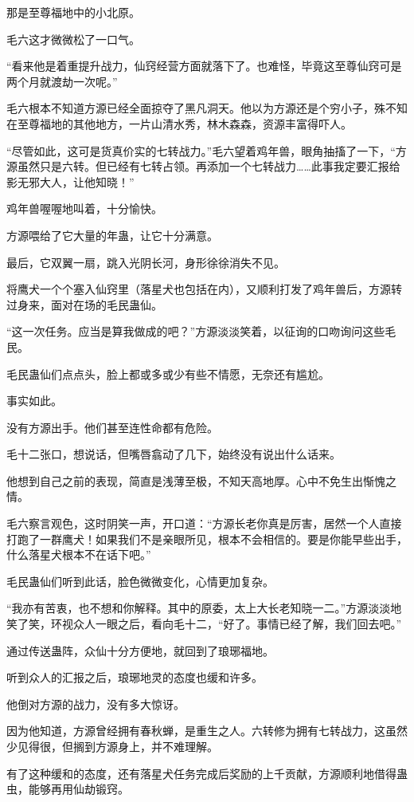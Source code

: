 \begin{this_body}
那是至尊福地中的小北原。

毛六这才微微松了一口气。

“看来他是着重提升战力，仙窍经营方面就落下了。也难怪，毕竟这至尊仙窍可是两个月就渡劫一次呢。”

毛六根本不知道方源已经全面掠夺了黑凡洞天。他以为方源还是个穷小子，殊不知在至尊福地的其他地方，一片山清水秀，林木森森，资源丰富得吓人。

“尽管如此，这可是货真价实的七转战力。”毛六望着鸡年兽，眼角抽搐了一下，“方源虽然只是六转。但已经有七转占领。再添加一个七转战力……此事我定要汇报给影无邪大人，让他知晓！”

鸡年兽喔喔地叫着，十分愉快。

方源喂给了它大量的年蛊，让它十分满意。

最后，它双翼一扇，跳入光阴长河，身形徐徐消失不见。

将鹰犬一个个塞入仙窍里（落星犬也包括在内），又顺利打发了鸡年兽后，方源转过身来，面对在场的毛民蛊仙。

“这一次任务。应当是算我做成的吧？”方源淡淡笑着，以征询的口吻询问这些毛民。

毛民蛊仙们点点头，脸上都或多或少有些不情愿，无奈还有尴尬。

事实如此。

没有方源出手。他们甚至连性命都有危险。

毛十二张口，想说话，但嘴唇翕动了几下，始终没有说出什么话来。

他想到自己之前的表现，简直是浅薄至极，不知天高地厚。心中不免生出惭愧之情。

毛六察言观色，这时阴笑一声，开口道：“方源长老你真是厉害，居然一个人直接打跑了一群鹰犬！如果我们不是亲眼所见，根本不会相信的。要是你能早些出手，什么落星犬根本不在话下吧。”

毛民蛊仙们听到此话，脸色微微变化，心情更加复杂。

“我亦有苦衷，也不想和你解释。其中的原委，太上大长老知晓一二。”方源淡淡地笑了笑，环视众人一眼之后，看向毛十二，“好了。事情已经了解，我们回去吧。”

通过传送蛊阵，众仙十分方便地，就回到了琅琊福地。

听到众人的汇报之后，琅琊地灵的态度也缓和许多。

他倒对方源的战力，没有多大惊讶。

因为他知道，方源曾经拥有春秋蝉，是重生之人。六转修为拥有七转战力，这虽然少见得很，但搁到方源身上，并不难理解。

有了这种缓和的态度，还有落星犬任务完成后奖励的上千贡献，方源顺利地借得蛊虫，能够再用仙劫锻窍。


\end{this_body}
